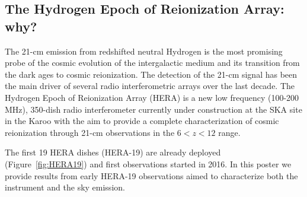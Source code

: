 \documentclass[a0,portrait]{a0poster}
\begin{document}

\begin{multicols}{2} %


\color{DarkSlateGray}

%
\section{The Hydrogen Epoch of Reionization Array: why?}
The 21-cm emission from redshifted neutral Hydrogen is the most promising probe of the cosmic evolution of the intergalactic medium and its transition from the dark ages to cosmic reionization. The detection of the 21-cm signal has been the main driver of several radio interferometric arrays over the last decade. The Hydrogen Epoch of Reionization Array (HERA) is a new low frequency (100-200 MHz), 350-dish radio interferometer currently under construction at the SKA site in the Karoo with the aim to provide a complete characterization of cosmic reionization through 21-cm observations in the $6 < z < 12$ range. 

The first 19 HERA dishes (HERA-19) are already deployed (Figure~\ref{fig:HERA19}) and first observations started in 2016. In this poster we provide results from early HERA-19 observations aimed to characterize both the instrument and the sky emission.






\end{multicols}
\end{document}
